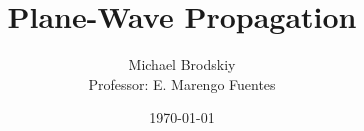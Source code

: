 


\title{Plane-Wave Propagation}
\date{\today}
\author{Michael Brodskiy\\ \small Professor: E. Marengo Fuentes}



\maketitle

